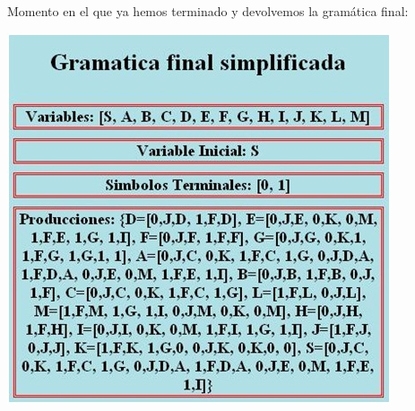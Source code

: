 \documentclass[12pt,a4paper,spanish]{book}
\begin{document}
\newpage
Momento en el que ya hemos terminado y devolvemos la gram\'atica final:\\
\newline
\begin{center}
\includegraphics{gram5.jpg}
\end{center}
\end{document}
